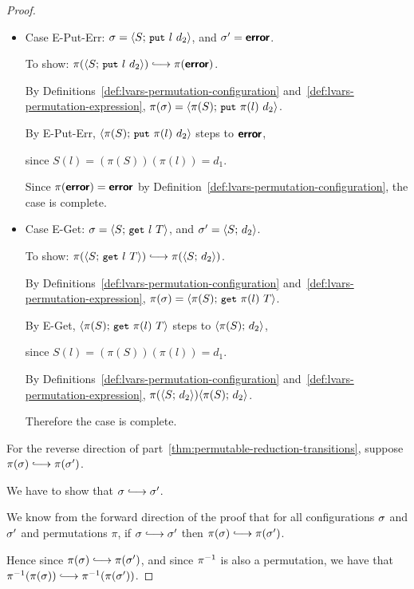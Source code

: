 \begin{proof}
\begin{itemize}
    \item Case {\sc E-Put-Err}: $\sigma = \langle S;\, \mbox{\small{\texttt{put}}}~l~d_2 \rangle$,
      and $\sigma' = \textbf{\textsf{error}}$.

      To show: $\pi(\config{S}{\putexp{l}{d_2}}) \parstepsto
      \pi(\error)$.

      By Definitions~\ref{def:lvars-permutation-configuration}
      and~\ref{def:lvars-permutation-expression}, $\pi(\sigma) =
      \langle \pi(S);\, \mbox{\small{\texttt{put}}}~\pi(l)~d_2 \rangle$.

      By {\sc E-Put-Err}, $\langle \pi(S);\, \mbox{\small{\texttt{put}}}~\pi(l)~d_2 \rangle$
      steps to $\textbf{\textsf{error}}$,

      since $S(l) = (\pi(S))(\pi(l)) = d_1$.

      Since $\pi(\textbf{\textsf{error}}) = \textbf{\textsf{error}}$ by
      Definition~\ref{def:lvars-permutation-configuration}, the case
      is complete.

    \item Case {\sc E-Get}: $\sigma = \langle S;\, \mbox{\small{\texttt{get}}}~l~T \rangle$, and
      $\sigma' = \langle S;\, d_2 \rangle$.

      To show: $\pi(\config{S}{\getexp{l}{T}}) \parstepsto
      \pi(\config{S}{d_2})$.

      By Definitions~\ref{def:lvars-permutation-configuration}
      and~\ref{def:lvars-permutation-expression}, $\pi(\sigma) =
      \langle \pi(S);\, \mbox{\small{\texttt{get}}}~\pi(l)~T \rangle$.

      By {\sc E-Get}, $\langle \pi(S);\, \mbox{\small{\texttt{get}}}~\pi(l)~T \rangle$ steps to
      $\langle \pi(S);\, d_2 \rangle$,

      since $S(l) = (\pi(S))(\pi(l)) = d_1$.

      By Definitions~\ref{def:lvars-permutation-configuration}
      and~\ref{def:lvars-permutation-expression},
      $\pi(\langle S;\, d_2 \rangle) \langle \pi(S);\, d_2 \rangle$.

      Therefore the case is complete.
  \end{itemize}

  For the reverse direction of
  part~\ref{thm:permutable-reduction-transitions}, suppose $\pi(\conf)
  \parstepsto \pi(\conf')$.

  We have to show that $\conf \parstepsto \conf'$.

  We know from the forward direction of the proof that for all
  configurations $\sigma$ and $\sigma'$ and permutations $\pi$, if
  $\conf \parstepsto \conf'$ then $\pi(\conf) \parstepsto
  \pi(\conf')$.

  Hence since $\pi(\conf) \parstepsto \pi(\conf')$, and since $\pi^{-1}$
  is also a permutation, we have that $\piinv(\pi(\conf)) \parstepsto
  \piinv(\pi(\conf'))$.


\end{proof}
